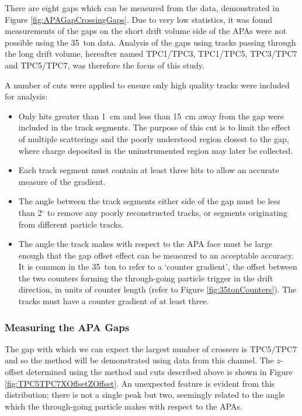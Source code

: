 There are eight gaps which can be measured from the data, demonstrated in Figure \ref{fig:APAGapCrossingGaps}.  Due to very low statistics, it was found measurements of the gaps on the short drift volume side of the APAs were not possible using the 35~ton data.  Analysis of the gaps using tracks passing through the long drift volume, hereafter named TPC1/TPC3, TPC1/TPC5, TPC3/TPC7 and TPC5/TPC7, was therefore the focus of this study.

A number of cuts were applied to ensure only high quality tracks were included for analysis:
\begin{itemize}
  \item{Only hits greater than 1~cm and less than 15~cm away from the gap were included in the track segments.  The purpose of this cut is to limit the effect of multiple scatterings and the poorly understood region closest to the gap, where charge deposited in the uninstrumented region may later be collected.}
  \item{Each track segment must contain at least three hits to allow an accurate measure of the gradient.}
  \item{The angle between the track segments either side of the gap must be less than 2$^\circ$ to remove any poorly reconstructed tracks, or segments originating from different particle tracks.}
  \item{The angle the track makes with respect to the APA face must be large enough that the gap offset effect can be measured to an acceptable accuracy.  It is common in the 35~ton to refer to a `counter gradient', the offset between the two counters forming the through-going particle trigger in the drift direction, in units of counter length (refer to Figure \ref{fig:35tonCounters}).  The tracks must have a counter gradient of at least three.}
\end{itemize}

\subsubsection{Measuring the APA Gaps}\label{sec:MeasuringAPAGaps}

The gap with which we can expect the largest number of crossers is TPC5/TPC7 and so the method will be demonstrated using data from this channel.  The $z$-offset determined using the method and cuts described above is shown in Figure \ref{fig:TPC5TPC7XOffsetZOffset}.  An unexpected feature is evident from this distribution; there is not a single peak but two, seemingly related to the angle which the through-going particle makes with respect to the APAs.

